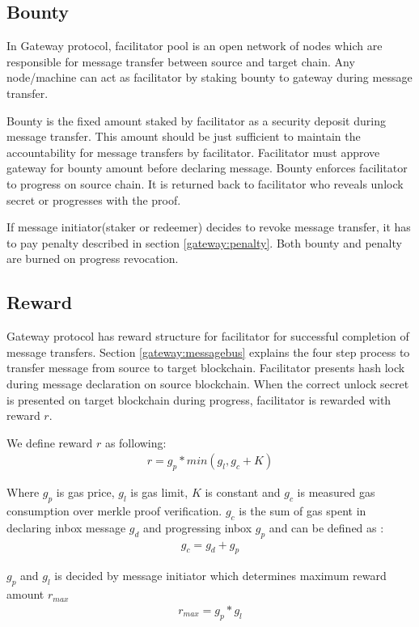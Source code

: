 \documentclass[12pt,a4paper]{article}
\begin{document}
\subsection{Bounty}\label{gateway:bounty}
 In Gateway protocol, facilitator pool is an open network of nodes which are responsible for message transfer between source and target chain. 
 Any node/machine can act as facilitator by staking bounty to gateway during message transfer. 

Bounty is the fixed amount staked by facilitator as a security deposit during message transfer.
This amount should be just sufficient to maintain the accountability for message transfers by facilitator. 
Facilitator must approve gateway for bounty amount before declaring message. 
Bounty enforces facilitator to progress on source chain. 
It is returned back to facilitator who reveals unlock secret or progresses with the proof.

If message initiator(staker or redeemer) decides to revoke message transfer, it has to pay penalty described in section \ref{gateway:penalty}. 
Both bounty and penalty are burned on progress revocation. 

\subsection{Reward}\label{gateway:reward}
Gateway protocol has reward structure for facilitator for successful completion of message transfers. 
Section \ref{gateway:messagebus} explains the four step process to transfer message from source to target blockchain. 
Facilitator presents hash lock during message declaration on source blockchain. 
When the correct unlock secret is presented on target blockchain during progress, facilitator is rewarded with reward $r$. 

We define reward $r$ as following:
 \begin{align}
 	r  = g_p  *  min(g_l, g_c + K) 
 \end{align}
                         
Where $g_p$ is gas price, $g_l$  is gas limit,  $K$ is constant and $g_c$  is measured gas consumption over merkle proof verification. $g_c$ is the sum of gas spent in declaring inbox message $g_d$ and progressing inbox $g_p$ and can be defined as :
 \begin{align}
 	g_c  = g_d  + g_p
 \end{align}
                                     
$g_p$ and $g_l$ is decided by message initiator which determines maximum reward amount $r_{max}$
 \begin{align}
 	r_{max}  = g_p *  g_l
 \end{align}
\end{document}
